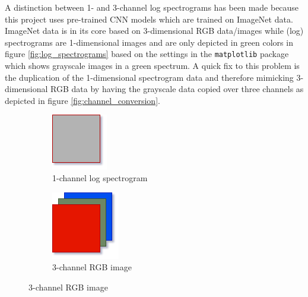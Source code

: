 \documentclass{article}
\theoremstyle{definition}
\theoremstyle{remark}
\begin{document}
A distinction between 1- and 3-channel log spectrograms has been made because this project uses pre-trained CNN models which are trained on ImageNet data. ImageNet data is in its core based on 3-dimensional RGB data/images while (log) spectrograms are 1-dimensional images and are only depicted in green colors in figure \ref{fig:log_spectrograms} based on the settings in the \texttt{matplotlib} package which shows grayscale images in a green spectrum. A quick fix to this problem is the duplication of the 1-dimensional spectrogram data and therefore mimicking 3-dimensional RGB data by having the grayscale data copied over three channels as depicted in figure \ref{fig:channel_conversion}.



\begin{figure}[h!]
\centering
\begin{subfigure}{.34\textwidth}
  \centering
  \includegraphics[width=0.5\linewidth]{img/grayscale.png}
  \caption{1-channel log spectrogram}
  \label{fig:sub1}
\end{subfigure}%
\begin{subfigure}{.34\textwidth}
  \centering
  \includegraphics[width=0.5\linewidth]{img/rgb.png}
  \caption{3-channel RGB image}
  \label{fig:sub2}
\end{subfigure}

\end{figure}
\end{document}
